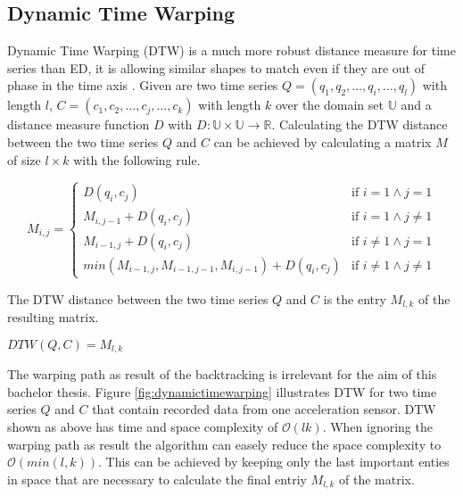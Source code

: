 \subsection{Dynamic Time Warping} \label{dynamic_time_warping}
Dynamic Time Warping (DTW) is a much more robust distance measure for time series than ED, it is allowing
similar shapes to match even if they are out of phase in the time axis \cite{keogh2002exact}. Given are two time series
$Q = (q_1, q_2, \dots, q_i, \dots, q_l)$ with length $l$, $C = (c_1, c_2, \dots, c_j, \dots, c_k)$ with length $k$ over
the domain set $\mathbb{U}$ and a distance measure function $D$ with $D: \mathbb{U} \times \mathbb{U} \to \mathbb{R}$.
Calculating the DTW distance between the two time series $Q$ and $C$ can be achieved by calculating a matrix $M$ of size
$l \times k$ with the following rule.
\begin{center} \[ M_{i, j} = \begin{cases}
    D(q_i,c_j) & \text{if } i = 1 \wedge j = 1\\
    M_{i,j-1} + D(q_i,c_j) & \text{if } i = 1 \wedge j \neq 1\\
    M_{i-1,j} + D(q_i,c_j) & \text{if } i \neq 1 \wedge j = 1\\
    min(M_{i-1,j}, M_{i-1,j-1}, M_{i,j-1}) + D(q_i,c_j) & \text{if } i \neq 1 \wedge j \neq 1
\end{cases} \] \end{center}
The DTW distance between the two time series $Q$ and $C$ is the entry $M_{l,k}$ of the resulting matrix.
\begin{center}
    $DTW(Q, C) = M_{l,k}$
\end{center}
The warping path as result of the backtracking is irrelevant for the aim of this bachelor thesis. Figure
\ref{fig:dynamictimewarping} illustrates DTW for two time series $Q$ and $C$ that contain recorded data from one
acceleration sensor. DTW shown as above has time and space complexity of $\mathcal{O}(lk)$. When ignoring the
warping path as result the algorithm can easely reduce the space complexity to $\mathcal{O}(min(l, k))$. This can be
achieved by keeping only the last important enties in space that are necessary to calculate the final entriy $M_{l,k}$
of the matrix.

